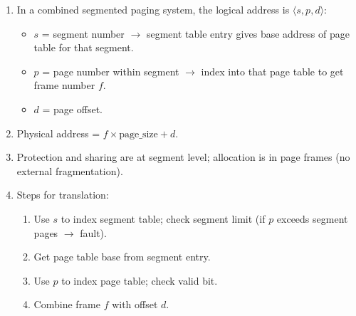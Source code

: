 \documentclass[11pt]{article}
\newcommand{\cle}[1]{{\popxbold\color{popdark}#1}}
\begin{document}
\begin{methode}
\begin{enumerate}
\item In a combined \cle{segmented paging} system, the logical address is $\langle s, p, d \rangle$:
\begin{itemize}
\item $s$ = segment number $\rightarrow$ segment table entry gives base address of \cle{page table} for that segment.
\item $p$ = page number within segment $\rightarrow$ index into that page table to get frame number $f$.
\item $d$ = page offset.
\end{itemize}
\item Physical address = $f \times \text{page\_size} + d$.
\item Protection and sharing are at segment level; allocation is in page frames (no external fragmentation).
\item Steps for translation:
\begin{enumerate}
\item Use $s$ to index segment table; check segment limit (if $p$ exceeds segment pages $\rightarrow$ fault).
\item Get page table base from segment entry.
\item Use $p$ to index page table; check valid bit.
\item Combine frame $f$ with offset $d$.
\end{enumerate}
\end{enumerate}
\end{methode}
\end{document}
